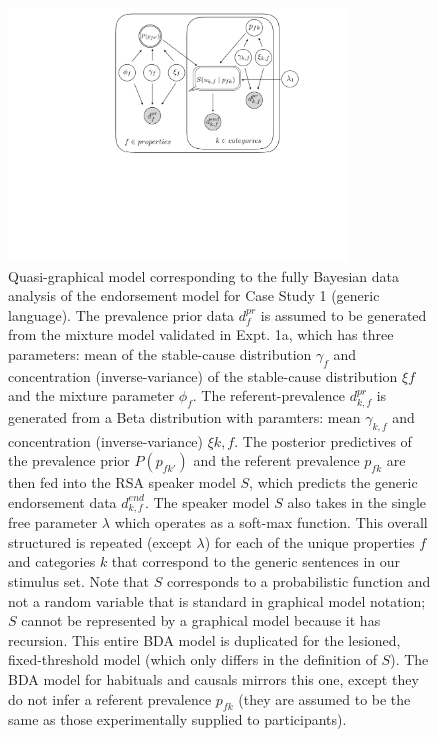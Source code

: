 \documentclass[english,,man,floatsintext]{apa6}
\theoremstyle{definition}
\theoremstyle{definition}
\theoremstyle{definition}
\theoremstyle{remark}
\begin{document}
\begin{figure}

{\centering \includegraphics[width=0.8\textwidth]{figs/generics_bayesnetmodel} 

}

\caption{Quasi-graphical model corresponding to the fully Bayesian data analysis of the endorsement model for Case Study 1 (generic language). The prevalence prior data $d^{pr}_{f}$ is assumed to be generated from the mixture model validated in Expt. 1a, which has three parameters: mean of the stable-cause distribution $\gamma_{f}$ and concentration (inverse-variance) of the stable-cause distribution $\xi{f}$ and the mixture parameter $\phi_{f}$. The referent-prevalence $d^{pr}_{k,f}$ is generated from a Beta distribution with paramters: mean $\gamma_{k,f}$ and concentration (inverse-variance) $\xi{k,f}$. The posterior predictives of the prevalence prior $P(p_{fk'})$ and the referent prevalence $p_{fk}$ are then fed into the RSA speaker model $S$, which predicts the generic endorsement data $d^{end}_{k, f}$. The speaker model $S$ also takes in the single free parameter $\lambda$ which operates as a soft-max function. This overall structured is repeated (except $\lambda$) for each of the unique properties $f$ and categories $k$ that correspond to the generic sentences in our stimulus set. Note that $S$ corresponds to a probabilistic function and not a random variable that is standard in graphical model notation; $S$ cannot be represented by a graphical model because it has recursion. This entire BDA model is duplicated for the lesioned, fixed-threshold model (which only differs in the definition of $S$). The BDA model for habituals and causals mirrors this one, except they do not infer a referent prevalence $p_{fk}$ (they are assumed to be the same as those experimentally supplied to participants).}\label{fig:genericsModelDiagram}
\end{figure}
\end{document}
